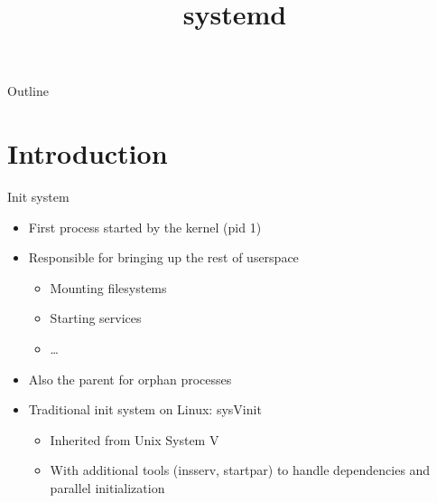 \documentclass[11pt,final,usepdftitle=false]{beamer}
\title{systemd}
\date{}
\begin{document}
\frame{\titlepage}

\begin{frame}{Outline}
	\tableofcontents
\end{frame}

\section{Introduction}

\begin{frame}{Init system}
\begin{itemize}
\item First process started by the kernel (pid 1)
	\hbr
\item Responsible for \alert{bringing up the rest of userspace}
	\begin{itemize}
		\item Mounting filesystems
		\item Starting services
		\item \ldots
	\end{itemize}
	\hbr
\item Also the parent for orphan processes
	\hbr
\item Traditional init system on Linux: \alert{sysVinit}
	\begin{itemize}
		\item Inherited from Unix System V
		\item With additional tools (insserv, startpar) to handle dependencies and parallel initialization
	\end{itemize}
\end{itemize}
\end{frame}
\end{document}
